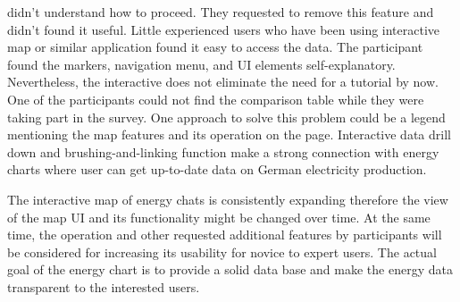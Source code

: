 didn’t understand how to proceed. They requested to remove this feature and didn’t found it useful. Little experienced users who have been using interactive map or similar application found it easy to access the data. The participant found the markers, navigation menu, and UI elements self-explanatory. Nevertheless, the interactive does not eliminate the need for a tutorial by now. One of the participants could not find the comparison table while they were taking part in the survey. One approach to solve this problem could be a legend mentioning the map features and its operation on the page. Interactive data drill down and brushing-and-linking function make a strong connection with energy charts where user can get up-to-date data on German electricity production. 

The interactive map of energy chats is consistently expanding therefore the view of the map UI and its functionality might be changed over time. At the same time, the operation and other requested additional features by participants will be considered for increasing its usability for novice to expert users. The actual goal of the energy chart is to provide a solid data base and make the energy data transparent to the interested users.  

